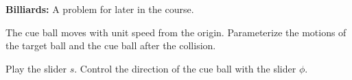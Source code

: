 \documentclass{ximera}
\begin{document}
\begin{example} {\bf Billiards:}
A problem for later in the course. 
\end{example}


\begin{question}
The cue ball moves with unit speed from the origin. Parameterize the motions of the target ball and the cue ball after the collision.
\end{question}

\begin{exploration}\label{exp:pc1c}
Play the slider $s$. Control the direction of the cue ball with the slider $\phi$. 

 
\begin{onlineOnly}
    \begin{center}
\end{center}
\end{onlineOnly}
\end{exploration}
\end{document}
